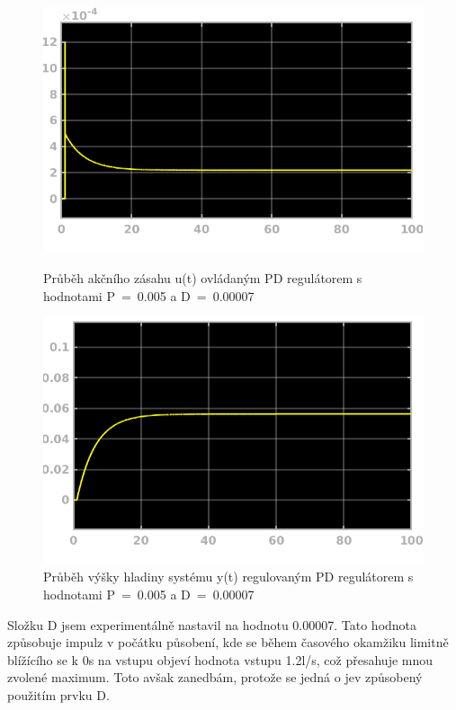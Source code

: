 \documentclass{article}
\begin{document}
	
	\begin{figure}[H]
	   		 \begin{minipage}[b]{.45\textwidth}
    \centering
    \includegraphics[width=\linewidth]{ukol3P0005DmaleIU}
    \caption{Průběh akčního zásahu u(t) ovládaným PD regulátorem s hodnotami P~=~0.005 a D~=~0.00007}
  \end{minipage}\hfill
  \begin{minipage}[b]{.45\textwidth}
    \centering
    \includegraphics[width=\linewidth]{ukol3P0005DmaleIY}
    \caption{Průběh výšky hladiny systému y(t) regulovaným PD regulátorem s hodnotami P~=~0.005 a D~=~0.00007}
    \label{img:hladinaPD0005}
  \end{minipage}
	   		\end{figure}
	   		

	\indent Složku D jsem experimentálně nastavil na hodnotu 0.00007. Tato hodnota způsobuje impulz v počátku působení, kde se během časového okamžiku limitně blížícího se k 0s na vstupu objeví hodnota vstupu 1.2l/s, což přesahuje mnou zvolené maximum. Toto avšak zanedbám, protože se jedná o jev způsobený použitím prvku D.
	
\end{document}
